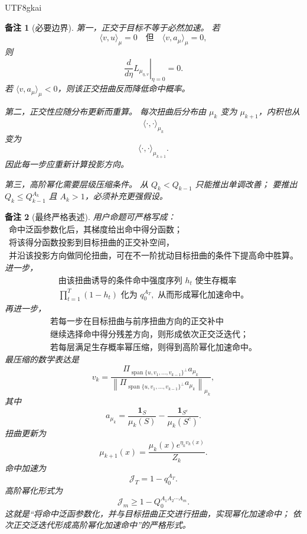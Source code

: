 \documentclass[12pt]{article}
\newtheorem{remark}{备注}[section]
\begin{document}
\begin{CJK*}{UTF8}{gkai}
\begin{remark}[必要边界]
第一，正交于目标不等于必然加速。
若
\[
  \langle v,u\rangle_\mu=0
  \quad\text{但}\quad
  \langle v,a_\mu\rangle_\mu=0,
\]
则
\[
  \left.
  \frac{d}{d\eta}
  L_{\mu_{\eta,v}}
  \right|_{\eta=0}
  =
  0.
\]
若 \(\langle v,a_\mu\rangle_\mu<0\)，则该正交扭曲反而降低命中概率。

第二，正交性应随分布更新而重算。
每次扭曲后分布由 \(\mu_k\) 变为 \(\mu_{k+1}\)，内积也从
\[
  \langle\cdot,\cdot\rangle_{\mu_k}
\]
变为
\[
  \langle\cdot,\cdot\rangle_{\mu_{k+1}}.
\]
因此每一步应重新计算投影方向。

第三，高阶幂化需要层级压缩条件。
从 \(Q_k<Q_{k-1}\) 只能推出单调改善；
要推出 \(Q_k\le Q_{k-1}^{A_k}\) 且 \(A_k>1\)，必须补充更强假设。
\end{remark}

\begin{remark}[最终严格表述]
用户命题可严格写成：
\[
  \boxed{
  \begin{gathered}
  \text{命中泛函参数化后，其梯度给出命中得分函数；}\\
  \text{将该得分函数投影到目标扭曲的正交补空间，}\\
  \text{并沿该投影方向做同伦扭曲，可在不一阶扰动目标扭曲的条件下提高命中胜算。}
  \end{gathered}
  }
\]
进一步，
\[
  \boxed{
  \begin{gathered}
  \text{由该扭曲诱导的条件命中强度序列 }h_t
  \text{ 使生存概率}\\
  \prod_{t=1}^{T}(1-h_t)
  \text{ 化为 }q_0^{A_T},
  \text{ 从而形成幂化加速命中。}
  \end{gathered}
  }
\]
再进一步，
\[
  \boxed{
  \begin{gathered}
  \text{若每一步在目标扭曲与前序扭曲方向的正交补中}\\
  \text{继续选择命中得分残差方向，则形成依次正交泛迭代；}\\
  \text{若每层满足生存概率幂压缩，则得到高阶幂化加速命中。}
  \end{gathered}
  }
\]
最压缩的数学表达是
\[
  \boxed{
  v_k
  =
  \frac{
  \Pi_{\operatorname{span}\{u,v_1,\ldots,v_{k-1}\}^{\perp}}
  a_{\mu_k}
  }{
  \left\lVert
  \Pi_{\operatorname{span}\{u,v_1,\ldots,v_{k-1}\}^{\perp}}
  a_{\mu_k}
  \right\rVert_{\mu_k}
  },
  }
\]
其中
\[
  a_{\mu_k}
  =
  \frac{\mathbf 1_S}{\mu_k(S)}
  -
  \frac{\mathbf 1_{S^c}}{\mu_k(S^c)}.
\]
扭曲更新为
\[
  \mu_{k+1}(x)
  =
  \frac{\mu_k(x)e^{\eta_k v_k(x)}}{Z_k}.
\]
命中加速为
\[
  \boxed{
  \mathcal J_T
  =
  1-q_0^{A_T}.
  }
\]
高阶幂化形式为
\[
  \boxed{
  \mathcal J_m
  \ge
  1-Q_0^{A_1A_2\cdots A_m}.
  }
\]
这就是“将命中泛函参数化，并与目标扭曲正交进行扭曲，实现幂化加速命中；
依次正交泛迭代形成高阶幂化加速命中”的严格形式。
\end{remark}


\end{CJK*}
\end{document}
